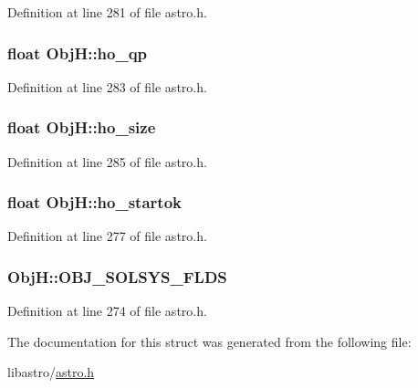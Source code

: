 Definition at line 281 of file astro.\-h.

\hypertarget{struct_obj_h_a89c7dcc10a5794cd1dc92c32a440433d}{
\subsubsection[{ho\-\_\-qp}]{\setlength{\rightskip}{0pt plus 5cm}float Obj\-H\-::ho\-\_\-qp}}\label{struct_obj_h_a89c7dcc10a5794cd1dc92c32a440433d}


Definition at line 283 of file astro.\-h.

\hypertarget{struct_obj_h_a336096f873915f72ec8729ce4fe97623}{
\subsubsection[{ho\-\_\-size}]{\setlength{\rightskip}{0pt plus 5cm}float Obj\-H\-::ho\-\_\-size}}\label{struct_obj_h_a336096f873915f72ec8729ce4fe97623}


Definition at line 285 of file astro.\-h.

\hypertarget{struct_obj_h_a09a9398b2a44b9a95d15284daa062da8}{
\subsubsection[{ho\-\_\-startok}]{\setlength{\rightskip}{0pt plus 5cm}float Obj\-H\-::ho\-\_\-startok}}\label{struct_obj_h_a09a9398b2a44b9a95d15284daa062da8}


Definition at line 277 of file astro.\-h.

\hypertarget{struct_obj_h_abb6e12c6ba111654831b0ace643d0e2c}{
\subsubsection[{O\-B\-J\-\_\-\-S\-O\-L\-S\-Y\-S\-\_\-\-F\-L\-D\-S}]{\setlength{\rightskip}{0pt plus 5cm}Obj\-H\-::\-O\-B\-J\-\_\-\-S\-O\-L\-S\-Y\-S\-\_\-\-F\-L\-D\-S}}\label{struct_obj_h_abb6e12c6ba111654831b0ace643d0e2c}


Definition at line 274 of file astro.\-h.



The documentation for this struct was generated from the following file\-:\begin{DoxyCompactItemize}
\item 
libastro/\hyperlink{astro_8h}{astro.\-h}\end{DoxyCompactItemize}
